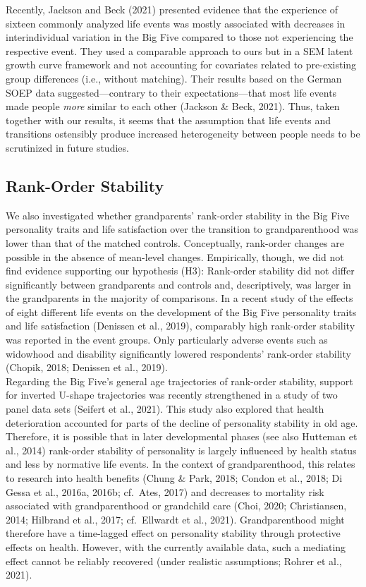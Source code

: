 \documentclass[
  english,
  man,floatsintext]{apa7}
\begin{document}
Recently, Jackson and Beck (2021) presented evidence that the experience of sixteen commonly analyzed life events was mostly associated with decreases in interindividual variation in the Big Five compared to those not experiencing the respective event. They used a comparable approach to ours but in a SEM latent growth curve framework and not accounting for covariates related to pre-existing group differences (i.e., without matching). Their results based on the German SOEP data suggested---contrary to their expectations---that most life events made people \emph{more} similar to each other (Jackson \& Beck, 2021). Thus, taken together with our results, it seems that the assumption that life events and transitions ostensibly produce increased heterogeneity between people needs to be scrutinized in future studies.

\hypertarget{rank-order-stability-1}{%
\subsection{Rank-Order Stability}\label{rank-order-stability-1}}

We also investigated whether grandparents' rank-order stability in the Big Five personality traits and life satisfaction over the transition to grandparenthood was lower than that of the matched controls. Conceptually, rank-order changes are possible in the absence of mean-level changes. Empirically, though, we did not find evidence supporting our hypothesis (H3): Rank-order stability did not differ significantly between grandparents and controls and, descriptively, was larger in the grandparents in the majority of comparisons. In a recent study of the effects of eight different life events on the development of the Big Five personality traits and life satisfaction (Denissen et al., 2019), comparably high rank-order stability was reported in the event groups. Only particularly adverse events such as widowhood and disability significantly lowered respondents' rank-order stability (Chopik, 2018; Denissen et al., 2019).\\
Regarding the Big Five's general age trajectories of rank-order stability, support for inverted U-shape trajectories was recently strengthened in a study of two panel data sets (Seifert et al., 2021). This study also explored that health deterioration accounted for parts of the decline of personality stability in old age. Therefore, it is possible that in later developmental phases (see also Hutteman et al., 2014) rank-order stability of personality is largely influenced by health status and less by normative life events. In the context of grandparenthood, this relates to research into health benefits (Chung \& Park, 2018; Condon et al., 2018; Di Gessa et al., 2016a, 2016b; cf.~Ates, 2017) and decreases to mortality risk associated with grandparenthood or grandchild care (Choi, 2020; Christiansen, 2014; Hilbrand et al., 2017; cf.~Ellwardt et al., 2021). Grandparenthood might therefore have a time-lagged effect on personality stability through protective effects on health. However, with the currently available data, such a mediating effect cannot be reliably recovered (under realistic assumptions; Rohrer et al., 2021).
\end{document}
